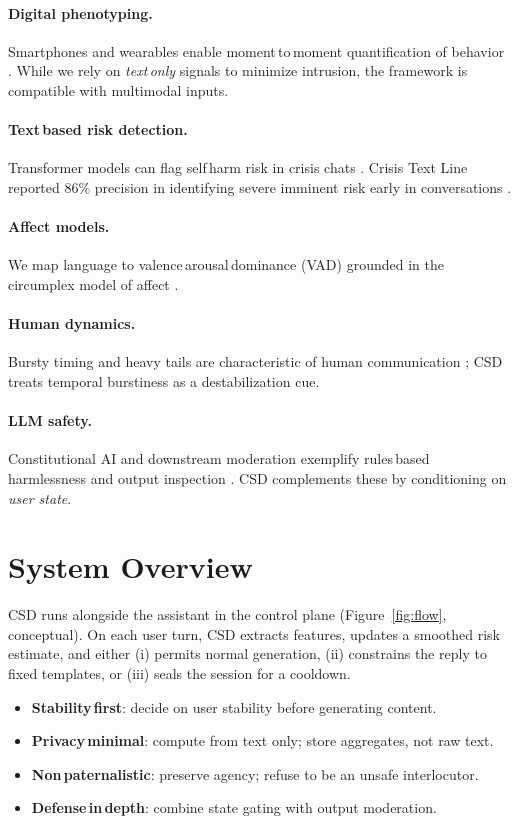 \documentclass[11pt]{article}
\begin{document}
\paragraph{Digital phenotyping.} Smartphones and wearables enable moment\,to\,moment quantification of behavior \parencite{Huckvale2019}. While we rely on \emph{text\,only} signals to minimize intrusion, the framework is compatible with multimodal inputs.
\paragraph{Text\,based risk detection.} Transformer models can flag self\,harm risk in crisis chats \parencite{Broadbent2023,Thomas2025}. Crisis Text Line reported 86\% precision in identifying severe imminent risk early in conversations \parencite{CTL2018}.
\paragraph{Affect models.} We map language to valence\,arousal\,dominance (VAD) \parencite{Warriner2013} grounded in the circumplex model of affect \parencite{Posner2005}.
\paragraph{Human dynamics.} Bursty timing and heavy tails are characteristic of human communication \parencite{Barabasi2005}; CSD treats temporal burstiness as a destabilization cue.
\paragraph{LLM safety.} Constitutional AI and downstream moderation exemplify rules\,based harmlessness and output inspection \parencite{Bai2022,EarlyStop2025}. CSD complements these by conditioning on \emph{user state}.

\section{System Overview}
CSD runs alongside the assistant in the control plane (Figure~\ref{fig:flow}, conceptual). On each user turn, CSD extracts features, updates a smoothed risk estimate, and either (i) permits normal generation, (ii) constrains the reply to fixed templates, or (iii) seals the session for a cooldown.

\begin{tcolorbox}[title=Key Design Goals, colback=gray!4]
\begin{itemize}[leftmargin=1.2em]
  \item \textbf{Stability\,first}: decide on user stability before generating content.
  \item \textbf{Privacy\,minimal}: compute from text only; store aggregates, not raw text.
  \item \textbf{Non\,paternalistic}: preserve agency; refuse to be an unsafe interlocutor.
  \item \textbf{Defense\,in\,depth}: combine state gating with output moderation.
\end{itemize}
\end{tcolorbox}
\end{document}
